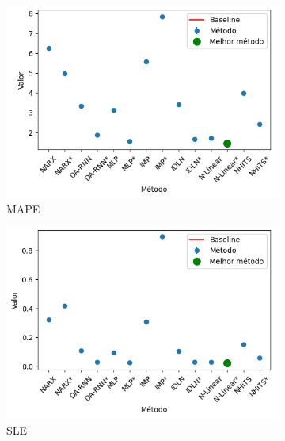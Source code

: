 \begin{figure}[htbp]
	\centering
	\begin{subfigure}[b]{0.3\textwidth}
		\centering
		\includegraphics[width=\textwidth]{figuras/mape_brasil_results_test.png}
		\caption{\ac{MAPE}}
		\label{fig:mape_brasil_results_test}
	\end{subfigure}
	\hfill
	\begin{subfigure}[b]{0.3\textwidth}
		\centering
		\includegraphics[width=\textwidth]{figuras/sle_brasil_results_test.png}
		\caption{\ac{SLE}}
		\label{fig:sle_brasil_results_test}
	\end{subfigure}
	\hfill
	\begin{subfigure}[b]{0.3\textwidth}
		\centering

\end{subfigure}
\end{figure}
